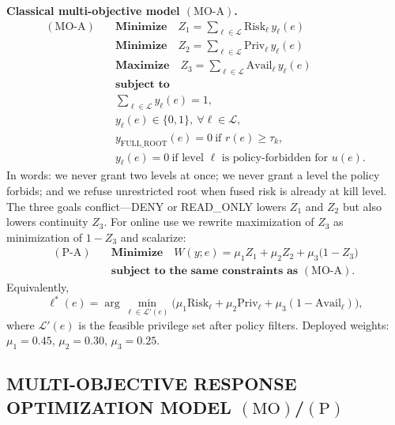 \documentclass{ieeeaccess}
\begin{document}
\textbf{Classical multi-objective model $(\mathrm{MO}\text{-}\mathrm{A})$.}
\begin{equation}
\begin{aligned}
(\mathrm{MO}\text{-}\mathrm{A})\quad
& \textbf{Minimize}\quad Z_1=\sum_{\ell\in\mathcal{L}} \mathrm{Risk}_{\ell}\, y_{\ell}(e) \\
& \textbf{Minimize}\quad Z_2=\sum_{\ell\in\mathcal{L}} \mathrm{Priv}_{\ell}\, y_{\ell}(e) \\
& \textbf{Maximize}\quad Z_3=\sum_{\ell\in\mathcal{L}} \mathrm{Avail}_{\ell}\, y_{\ell}(e) \\[0.35em]
& \textbf{subject to} \\
& \sum_{\ell\in\mathcal{L}} y_{\ell}(e)=1, \\
& y_{\ell}(e)\in\{0,1\},\ \forall \ell\in\mathcal{L}, \\
& y_{\mathrm{FULL\_ROOT}}(e)=0\ \text{if } r(e)\geq \tau_k, \\
& y_{\ell}(e)=0\ \text{if level $\ell$ is policy-forbidden for $u(e)$}.
\end{aligned}
\tag{A}\label{eq:moo-priv}
\end{equation}
In words: we never grant two levels at once; we never grant a level the policy forbids; and we refuse unrestricted root when fused risk is already at kill level. The three goals conflict---DENY or READ\_ONLY lowers $Z_1$ and $Z_2$ but also lowers continuity $Z_3$. For online use we rewrite maximization of $Z_3$ as minimization of $1-Z_3$ and scalarize:
\begin{equation}
\begin{aligned}
(\mathrm{P}\text{-}\mathrm{A})\quad
& \textbf{Minimize}\quad W(y;e)=\mu_1 Z_1+\mu_2 Z_2+\mu_3\bigl(1-Z_3\bigr) \\[0.35em]
& \textbf{subject to the same constraints as }(\mathrm{MO}\text{-}\mathrm{A}).
\end{aligned}
\tag{PA}\label{eq:moo-priv-scalar}
\end{equation}
Equivalently,
\begin{equation}
\ell^*(e)=\arg\min_{\ell\in\mathcal{L}'(e)}\bigl(\mu_1\mathrm{Risk}_{\ell}+\mu_2\mathrm{Priv}_{\ell}+\mu_3(1-\mathrm{Avail}_{\ell})\bigr),
\tag{A4}
\end{equation}
where $\mathcal{L}'(e)$ is the feasible privilege set after policy filters. Deployed weights: $\mu_1{=}0.45$, $\mu_2{=}0.30$, $\mu_3{=}0.25$.

\subsection{MULTI-OBJECTIVE RESPONSE OPTIMIZATION MODEL $(\mathrm{MO})$/$(\mathrm{P})$}
\end{document}
